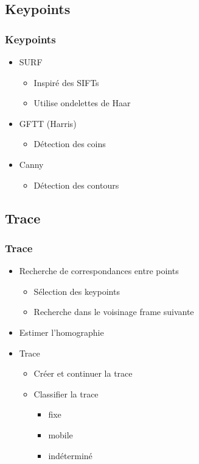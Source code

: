 \subsection{Keypoints}
\begin{frame}
  \frametitle{Keypoints}
  
  \begin{itemize}
  \item SURF
  	\begin{itemize}
  	\item Inspiré des SIFTs
  	\item Utilise ondelettes de Haar
  	\end{itemize}
  	
  \item GFTT (Harris)
	\begin{itemize}
  	\item Détection des coins
  	\end{itemize}
  	
  \item Canny
    \begin{itemize}
  	\item Détection des contours
  	\end{itemize}
  	
  \end{itemize}


\end{frame}



\subsection{Trace}
\begin{frame}
  \frametitle{Trace}
  \begin{itemize}
  \item Recherche de correspondances entre points
  	\begin{itemize}
  	\item Sélection des keypoints
  	\item Recherche dans le voisinage frame suivante
  	\end{itemize}
  \item Estimer l'homographie
  \item Trace
  	\begin{itemize}
  	\item Créer et continuer la trace
  	\item Classifier la trace
  	\begin{itemize}
  		\item fixe
  		\item mobile
  		\item indéterminé
  	\end{itemize}
  	\end{itemize}
  \end{itemize}
  


\end{frame}


